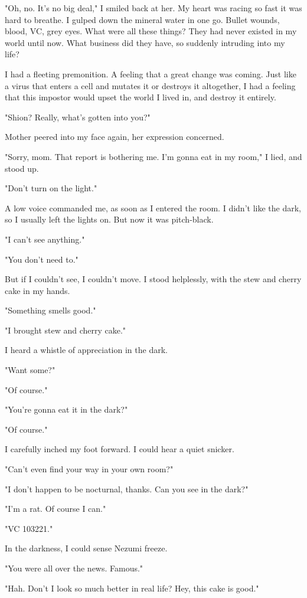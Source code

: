 "Oh, no. It's no big deal," I smiled back at her. My heart was racing so
fast it was hard to breathe. I gulped down the mineral water in one go.
Bullet wounds, blood, VC, grey eyes. What were all these things? They
had never existed in my world until now. What business did they have, so
suddenly intruding into my life?

I had a fleeting premonition. A feeling that a great change was coming.
Just like a virus that enters a cell and mutates it or destroys it
altogether, I had a feeling that this impostor would upset the world I
lived in, and destroy it entirely.

"Shion? Really, what's gotten into you?"

Mother peered into my face again, her expression concerned.

"Sorry, mom. That report is bothering me. I'm gonna eat in my room," I
lied, and stood up.

\myspace

"Don't turn on the light."

A low voice commanded me, as soon as I entered the room. I didn't like
the dark, so I usually left the lights on. But now it was pitch-black.

"I can't see anything."

"You don't need to."

But if I couldn't see, I couldn't move. I stood helplessly, with the
stew and cherry cake in my hands.

"Something smells good."

"I brought stew and cherry cake."

I heard a whistle of appreciation in the dark.

"Want some?"

"Of course."

"You're gonna eat it in the dark?"

"Of course."

I carefully inched my foot forward. I could hear a quiet snicker.

"Can't even find your way in your own room?"

"I don't happen to be nocturnal, thanks. Can you see in the dark?"

"I'm a rat. Of course I can."

"VC 103221."

In the darkness, I could sense Nezumi freeze.

"You were all over the news. Famous."

"Hah. Don't I look so much better in real life? Hey, this cake is good."


